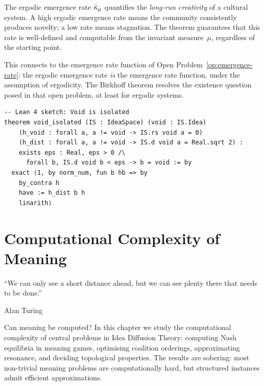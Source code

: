 \begin{interpretation}
The ergodic emergence rate $\bar{\kappa}_\mu$ quantifies the
\emph{long-run creativity} of a cultural system.  A high ergodic
emergence rate means the community consistently produces novelty;
a low rate means stagnation.  The theorem guarantees that this rate
is well-defined and computable from the invariant measure~$\mu$,
regardless of the starting point.

This connects to the emergence rate function of Open
Problem~\ref{op:emergence-rate}: the ergodic emergence rate
\emph{is} the emergence rate function, under the assumption of
ergodicity.  The Birkhoff theorem resolves the existence question
posed in that open problem, at least for ergodic systems.
\end{interpretation}

\begin{lstlisting}
-- Lean 4 sketch: Void is isolated
theorem void_isolated (IS : IdeaSpace) (void : IS.Idea)
    (h_void : forall a, a != void -> IS.rs void a = 0)
    (h_dist : forall a, a != void -> IS.d void a = Real.sqrt 2) :
    exists eps : Real, eps > 0 /\
      forall b, IS.d void b < eps -> b = void := by
  exact ⟨1, by norm_num, fun b hb => by
    by_contra h
    have := h_dist b h
    linarith⟩
\end{lstlisting}




\chapter{Computational Complexity of Meaning}
\label{ch:computation}

\epigraph{``We can only see a short distance ahead, but we can
see plenty there that needs to be done.''}{Alan Turing}

Can meaning be computed?  In this chapter we study the
computational complexity of central problems in Idea Diffusion
Theory: computing Nash equilibria in meaning games, optimising
coalition orderings, approximating resonance, and deciding
topological properties.  The results are sobering: most
non-trivial meaning problems are computationally hard, but
structured instances admit efficient approximations.

